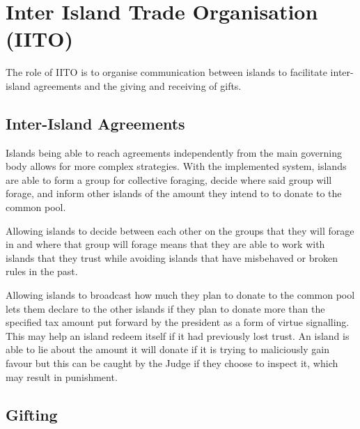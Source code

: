 \chapter{Inter Island Trade Organisation (IITO)}

The role of IITO is to organise communication between islands to facilitate inter-island agreements and the giving and receiving of gifts.  

\section{Inter-Island Agreements}  
\label{sec:IITO:inter_island_agreements}  


Islands being able to reach agreements independently from the main governing body allows for more complex strategies. With the implemented system, islands are able to form a group for collective foraging, decide where said group will forage, and inform other islands of the amount they intend to to donate to the common pool.  

Allowing islands to decide between each other on the groups that they will forage in and where that group will forage means that they are able to work with islands that they trust while avoiding islands that have misbehaved or broken rules in the past.


Allowing islands to broadcast how much they plan to donate to the common pool lets them declare to the other islands if they plan to donate more than the specified tax amount put forward by the president as a form of virtue signalling. This may help an island redeem itself if it had previously lost trust. An island is able to lie about the amount it will donate if it is trying to maliciously gain favour but this can be caught by the Judge if they choose to inspect it, which may result in punishment.


\section{Gifting}  
\label{sec:IITO:gifting}  

